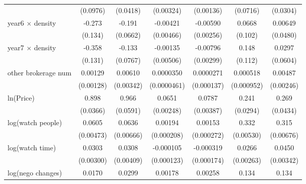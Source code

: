 {\begin{adjustbox}{max width=\textwidth}
\begin{adjustbox}{max width=\textwidth}
\begin{tabular}{l*{6}{c}}
            &    (0.0976)         &    (0.0418)         &   (0.00324)         &   (0.00136)         &    (0.0716)         &    (0.0304)         \\
\addlinespace
year6 $\times$ density&      -0.273\sym{**} &      -0.191\sym{***}&    -0.00421         &    -0.00590\sym{**} &      0.0668         &     0.00649         \\
            &     (0.134)         &    (0.0662)         &   (0.00466)         &   (0.00256)         &     (0.102)         &    (0.0480)         \\
\addlinespace
year7 $\times$ density&      -0.358\sym{***}&      -0.133\sym{*}  &    -0.00135         &    -0.00796\sym{***}&       0.148         &      0.0297         \\
            &     (0.131)         &    (0.0767)         &   (0.00506)         &   (0.00299)         &     (0.112)         &    (0.0604)         \\
\addlinespace
other brokerage num  &     0.00129         &     0.00610\sym{*}  &   0.0000350         &   0.0000271         &    0.000518         &     0.00487\sym{**} \\
            &   (0.00128)         &   (0.00342)         & (0.0000461)         &  (0.000137)         &  (0.000952)         &   (0.00246)         \\
\addlinespace
ln(Price)&       0.898\sym{***}&       0.966\sym{***}&      0.0651\sym{***}&      0.0787\sym{***}&       0.241\sym{***}&       0.269\sym{***}\\
            &    (0.0366)         &    (0.0591)         &   (0.00248)         &   (0.00387)         &    (0.0294)         &    (0.0434)         \\
\addlinespace
log(watch people)&      0.0605\sym{***}&      0.0636\sym{***}&     0.00194\sym{***}&     0.00153\sym{***}&       0.332\sym{***}&       0.315\sym{***}\\
            &   (0.00473)         &   (0.00666)         &  (0.000208)         &  (0.000272)         &   (0.00530)         &   (0.00676)         \\
\addlinespace
log(watch time)&      0.0303\sym{***}&      0.0308\sym{***}&   -0.000105         &   -0.000319\sym{*}  &      0.0266\sym{***}&      0.0450\sym{***}\\
            &   (0.00300)         &   (0.00409)         &  (0.000123)         &  (0.000174)         &   (0.00263)         &   (0.00342)         \\
\addlinespace
log(nego changes)&      0.0170\sym{**} &      0.0299\sym{**} &     0.00178\sym{***}&     0.00258\sym{***}&       0.134\sym{***}&       0.134\sym{***}\\

\end{tabular}
\end{adjustbox}
\end{adjustbox}}
